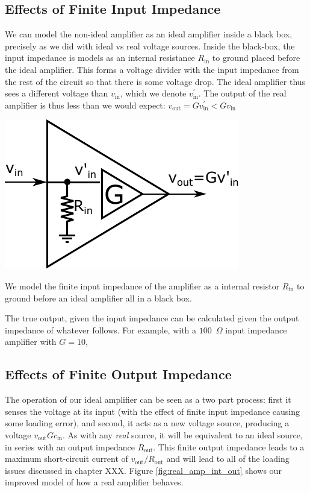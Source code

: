 \documentclass{tufte-book}
\begin{document}
\subsection{Effects of Finite Input Impedance}
\label{sec:AMP_effect_input}
We can model the non-ideal amplifier as an ideal amplifier inside a black box, precisely as we did with ideal vs real voltage sources. Inside the black-box, the input impedance is models as an internal resistance $R_\text{in}$ to ground placed before the ideal amplifier. This forms a voltage divider with the input impedance from the rest of the circuit so that there is some voltage drop. The ideal amplifier thus sees a different voltage than $v_\text{in}$, which we denote $v^\prime_\text{in}$. The output of the real amplifier is thus less than we would expect: $v_\text{out} = Gv^\prime_\text{in} < Gv_\text{in}$

\begin{marginfigure}%
  \includegraphics[width=\linewidth]{RealAmplifier_int}
  \caption{We model the finite input impedance of the amplifier as a internal resistor $R_\text{in}$ to ground before an ideal amplifier all in a black box.}
  \label{fig:real_amp_int}
\end{marginfigure}


The true output, given the input impedance can be calculated given the output impedance of whatever follows. For example, with a $100$~$\Omega$ input impedance amplifier with $G = 10$, 

\subsection{Effects of Finite Output Impedance}
The operation of our ideal amplifier can be seen as a two part process: first it senses the voltage at its input (with the effect of finite input impedance causing some loading error), and second, it acts as a new voltage source, producing a voltage $v_\text{out} Gc_\text{in}$. As with any \textit{real} source, it will be equivalent to an ideal source, in series with an output impedance $R_\text{out}$. This finite output impedance leads to a maximum short-circuit current of $v_\text{out}/R_\text{out}$ and will lead to all of the loading issues discussed in chapter XXX. Figure \ref{fig:real_amp_int_out} shows our improved model of how a real amplifier behaves.
\end{document}
